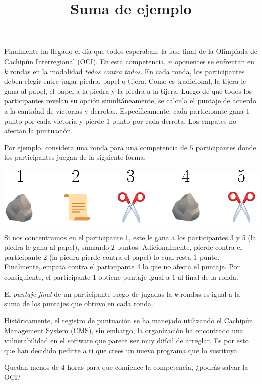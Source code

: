 \documentclass{oci}
\title{Suma de ejemplo}
\begin{document}
\begin{problemDescription}
  Finalmente ha llegado el día que todos esperaban:
  la fase final de la Olimpíada de Cachipún Interregional (OCI).
  En esta competencia, $n$ oponentes se enfrentan en $k$ rondas
  en la modalidad \emph{todos contra todos}.
  En cada ronda, los participantes deben elegir entre jugar piedra, papel o tijera.
  Como es tradicional, la tijera le gana al papel, el papel a la piedra y la piedra a
  la tijera.
  Luego de que todos los participantes revelan su opción simultáneamente, se
  calcula el puntaje de acuerdo a la cantidad de victorias y derrotas.
  Específicamente, cada participante gana $1$ punto por cada victoria
  y pierde $1$ punto por cada derrota.
  Los empates no afectan la puntuación.

  Por ejemplo, considera una ronda para una competencia de $5$ participantes donde
  los participantes juegan de la siguiente forma:
  \begin{center}
    \includegraphics[scale=0.8]{ronda.eps}
  \end{center}
  Si nos concentramos en el participante 1, este le gana a los participantes 3 y 5
  (la piedra le gana al papel), sumando $2$ puntos.
  Adicionalmente, pierde contra el participante 2 (la piedra pierde contra el papel)
  lo cual resta $1$ punto.
  Finalmente, empata contra el participante 4 lo que no afecta el puntaje.
  Por consiguiente, el participante 1 obtiene puntaje igual a $1$ al final de la ronda.

  El \emph{puntaje final} de un participante luego de jugadas la $k$ rondas
  es igual a la suma de los puntajes que obtuvo en cada ronda.

  Históricamente, el registro de puntuación se ha manejado utilizando el
  Cachipún Management System (CMS), sin embargo, la organización ha encontrado
  una vulnerabilidad en el software que parece ser muy difícil de arreglar.
  Es por esto que han decidido pedirte a ti que crees un nuevo programa que lo
  sustituya.

  Quedan menos de 4 horas para que comience la competencia, ¿podrás salvar la OCI?
\end{problemDescription}
\end{document}
